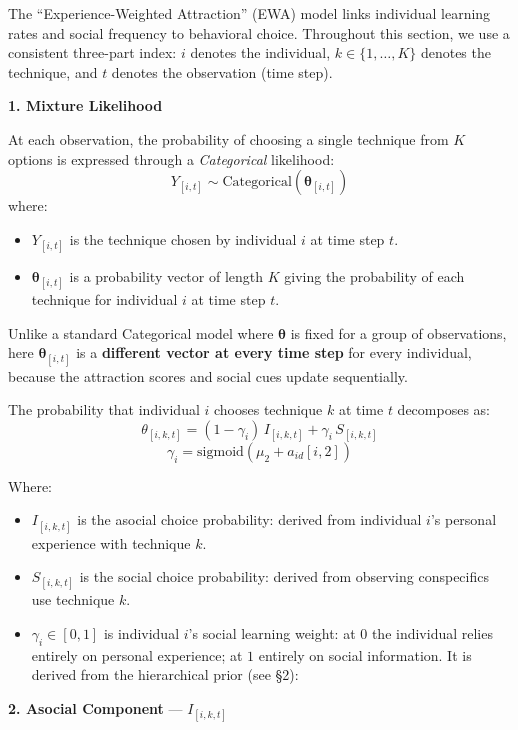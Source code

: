 \documentclass[
  letterpaper,
  DIV=11,
  numbers=noendperiod]{scrartcl}
\providecommand{\tightlist}{%
  \setlength{\itemsep}{0pt}\setlength{\parskip}{0pt}}\usepackage{longtable,booktabs,array}
\begin{document}
The ``Experience-Weighted Attraction'' (EWA) model links individual
learning rates and social frequency to behavioral choice. Throughout
this section, we use a consistent three-part index: \(i\) denotes the
individual, \(k \in \{1, \ldots, K\}\) denotes the technique, and \(t\)
denotes the observation (time step).

\textbf{1. Mixture Likelihood}

At each observation, the probability of choosing a single technique from
\(K\) options is expressed through a \emph{Categorical} likelihood: \[
Y_{[i,t]} \sim \text{Categorical}(\boldsymbol{\theta}_{[i,t]})
\] where:

\begin{itemize}
\tightlist
\item
  \(Y_{[i,t]}\) is the technique chosen by individual \(i\) at time step
  \(t\).
\item
  \(\boldsymbol{\theta}_{[i,t]}\) is a probability vector of length
  \(K\) giving the probability of each technique for individual \(i\) at
  time step \(t\).
\end{itemize}

Unlike a standard Categorical model where \(\boldsymbol{\theta}\) is
fixed for a group of observations, here \(\boldsymbol{\theta}_{[i,t]}\)
is a \textbf{different vector at every time step} for every individual,
because the attraction scores and social cues update sequentially.

The probability that individual \(i\) chooses technique \(k\) at time
\(t\) decomposes as: \[
\theta_{[i,k,t]} = (1 - \gamma_i)\, I_{[i,k,t]} + \gamma_i\, S_{[i,k,t]}
\] \[
\gamma_i = \text{sigmoid}(\mu_2 + a_{id}[i,2])
\]

Where:

\begin{itemize}
\tightlist
\item
  \(I_{[i,k,t]}\) is the asocial choice probability: derived from
  individual \(i\)'s personal experience with technique \(k\).
\item
  \(S_{[i,k,t]}\) is the social choice probability: derived from
  observing conspecifics use technique \(k\).
\item
  \(\gamma_i \in [0, 1]\) is individual \(i\)'s social learning weight:
  at \(0\) the individual relies entirely on personal experience; at
  \(1\) entirely on social information. It is derived from the
  hierarchical prior (see §2):
\end{itemize}

\textbf{2. Asocial Component} --- \(I_{[i,k,t]}\)
\end{document}
